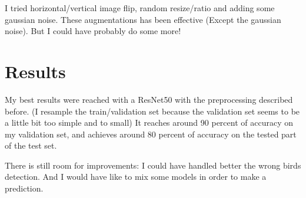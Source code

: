 \documentclass[final]{cvpr}
\begin{document}
I tried horizontal/vertical image flip, random resize/ratio and adding some gaussian noise.
These augmentations has been effective (Except the gaussian noise).
But I could have probably do some more!

\section{Results}

My best results were reached with a ResNet50 with the preprocessing described before.
(I resample the train/validation set because the validation set seems to be a little
bit too simple and to small) It reaches around 90 percent of accuracy on my validation set, and achieves
around 80 percent of accuracy on the tested part of the test set.

There is still room for improvements: I could have handled better the wrong birds detection. And I
would have like to mix some models in order to make a prediction.
\end{document}
